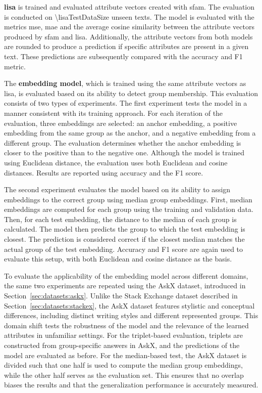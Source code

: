 \textbf{\ac{lisa}} is trained and evaluated attribute vectors created with \ac{sfam}. The evaluation is conducted on \num{\lisaTestDataSize} unseen texts. The model is evaluated with the metrics \ac{mse}, \ac{mae} and the average cosine similarity between the attribute vectors produced by \ac{sfam} and \ac{lisa}. Additionally, the attribute vectors from both models are rounded to produce a prediction if specific attributes are present in a given text. These predictions are subsequently compared with the accuracy and F1 metric.

The \textbf{embedding model}, which is trained using the same attribute vectors as \ac{lisa}, is evaluated based on its ability to detect group membership. This evaluation consists of two types of experiments. The first experiment tests the model in a manner consistent with its training approach. For each iteration of the evaluation, three embeddings are selected: an anchor embedding, a positive embedding from the same group as the anchor, and a negative embedding from a different group. The evaluation determines whether the anchor embedding is closer to the positive than to the negative one. Although the model is trained using Euclidean distance, the evaluation uses both Euclidean and cosine distances. Results are reported using accuracy and the F1 score.

The second experiment evaluates the model based on its ability to assign embeddings to the correct group using median group embeddings. First, median embeddings are computed for each group using the training and validation data. Then, for each test embedding, the distance to the median of each group is calculated. The model then predicts the group to which the test embedding is closest. The prediction is considered correct if the closest median matches the actual group of the test embedding. Accuracy and F1 score are again used to evaluate this setup, with both Euclidean and cosine distance as the basis.

To evaluate the applicability of the embedding model across different domains, the same two experiments are repeated using the AskX dataset, introduced in Section~\ref{sec:datasets:askx}. Unlike the Stack Exchange dataset described in Section~\ref{sec:datasets:stackex}, the AskX dataset features stylistic and conceptual differences, including distinct writing styles and different represented groups. This domain shift tests the robustness of the model and the relevance of the learned attributes in unfamiliar settings. For the triplet-based evaluation, triplets are constructed from group-specific answers in AskX, and the predictions of the model are evaluated as before. For the median-based test, the AskX dataset is divided such that one half is used to compute the median group embeddings, while the other half serves as the evaluation set. This ensures that no overlap biases the results and that the generalization performance is accurately measured.

